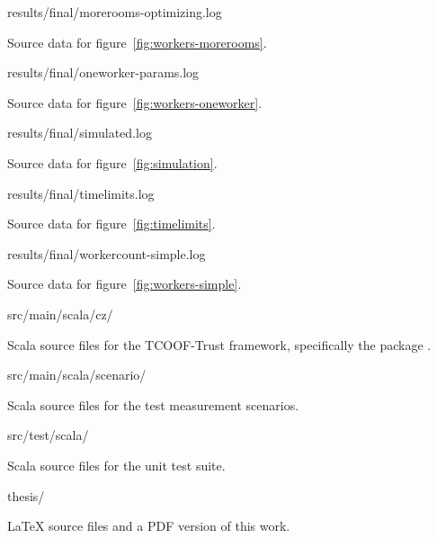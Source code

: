 \begin{filepath}
results/final/morerooms-optimizing.log
\end{filepath}
\begin{dsldesc}
    Source data for figure~\ref{fig:workers-morerooms}.
\end{dsldesc}

\begin{filepath}
results/final/oneworker-params.log
\end{filepath}
\begin{dsldesc}
    Source data for figure~\ref{fig:workers-oneworker}.
\end{dsldesc}

\begin{filepath}
results/final/simulated.log
\end{filepath}
\begin{dsldesc}
    Source data for figure~\ref{fig:simulation}.
\end{dsldesc}

\begin{filepath}
results/final/timelimits.log
\end{filepath}
\begin{dsldesc}
    Source data for figure~\ref{fig:timelimits}.
\end{dsldesc}

\begin{filepath}
results/final/workercount-simple.log
\end{filepath}
\begin{dsldesc}
    Source data for figure~\ref{fig:workers-simple}.
\end{dsldesc}

\begin{filepath}
src/main/scala/cz/
\end{filepath}
\begin{dsldesc}
    Scala source files for the TCOOF-Trust framework, specifically the package
    .
\end{dsldesc}

\begin{filepath}
src/main/scala/scenario/
\end{filepath}
\begin{dsldesc}
    Scala source files for the test measurement scenarios.
\end{dsldesc}

\begin{filepath}
src/test/scala/
\end{filepath}
\begin{dsldesc}
    Scala source files for the unit test suite.
\end{dsldesc}

\begin{filepath}
thesis/
\end{filepath}
\begin{dsldesc}
    \LaTeX{} source files and a PDF version of this work.
\end{dsldesc}
    